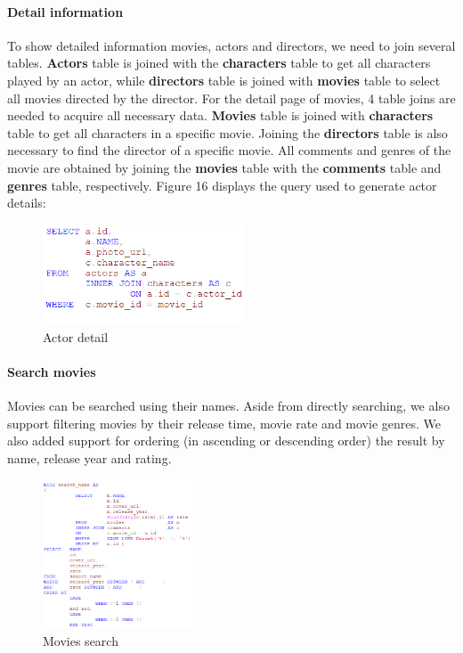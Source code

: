 \begin{CJK*}{UTF8}{gbsn}
\paragraph{Detail information} To show detailed information	 movies, actors and directors, we need to join several tables. \textbf{Actors} table is joined with the \textbf{characters} table to get all characters played by an actor, while \textbf{directors} table is joined with \textbf{movies} table to select all movies directed by the director. For the detail page of movies, 4 table joins are needed to acquire all necessary data. \textbf{Movies} table is joined with \textbf{characters} table to get all characters in a specific movie. Joining the \textbf{directors} table is also necessary to find the director of a specific movie. All comments and genres of the movie are obtained by joining the \textbf{movies} table with the \textbf{comments} table and \textbf{genres} table, respectively. Figure 16 displays the query used to generate actor details:

\begin{figure}[htbp]
\centering
\includegraphics[width=6cm]{a_detail.png}
\caption{Actor detail}
\end{figure}

\paragraph{Search movies}
Movies can be searched using their names. Aside from directly searching, we also support filtering movies by their release time, movie rate and movie genres. We also added support for ordering (in ascending or descending order) the result by name, release year and rating.
\begin{figure}[htbp]
\centering
\includegraphics[width=0.4\textwidth]{m_search.png}
\caption{Movies search}
\end{figure}

\end{CJK*}
